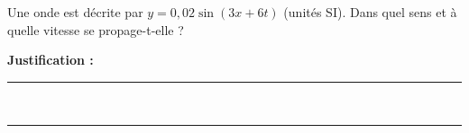 Une onde est décrite par $y = 0{,}02\sin(3x + 6t)$ (unités SI). Dans quel sens et à quelle vitesse se propage-t-elle ?

\choices

\noindent\textbf{Justification :} \hrulefill \\[2.5ex]
\rule{\linewidth}{0.4pt} \\[2.5ex]
\rule{\linewidth}{0.4pt}
\vfill
